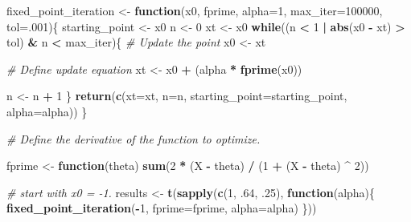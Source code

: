 \documentclass[]{article}
\newenvironment{Shaded}{\begin{snugshade}}{\end{snugshade}}
\newcommand{\KeywordTok}[1]{\textcolor[rgb]{0.13,0.29,0.53}{\textbf{#1}}}
\newcommand{\DataTypeTok}[1]{\textcolor[rgb]{0.13,0.29,0.53}{#1}}
\newcommand{\DecValTok}[1]{\textcolor[rgb]{0.00,0.00,0.81}{#1}}
\newcommand{\StringTok}[1]{\textcolor[rgb]{0.31,0.60,0.02}{#1}}
\newcommand{\CommentTok}[1]{\textcolor[rgb]{0.56,0.35,0.01}{\textit{#1}}}
\newcommand{\ControlFlowTok}[1]{\textcolor[rgb]{0.13,0.29,0.53}{\textbf{#1}}}
\newcommand{\OperatorTok}[1]{\textcolor[rgb]{0.81,0.36,0.00}{\textbf{#1}}}
\newcommand{\NormalTok}[1]{#1}
\begin{document}
\begin{Shaded}
\begin{Highlighting}[]
\NormalTok{fixed_point_iteration <-}\StringTok{ }\ControlFlowTok{function}\NormalTok{(x0, fprime, }\DataTypeTok{alpha=}\DecValTok{1}\NormalTok{, }\DataTypeTok{max_iter=}\DecValTok{100000}\NormalTok{, }\DataTypeTok{tol=}\NormalTok{.}\DecValTok{001}\NormalTok{)\{}
\NormalTok{  starting_point <-}\StringTok{ }\NormalTok{x0}
\NormalTok{  n <-}\StringTok{ }\DecValTok{0}
\NormalTok{  xt <-}\StringTok{ }\NormalTok{x0}
  \ControlFlowTok{while}\NormalTok{((n }\OperatorTok{<}\StringTok{ }\DecValTok{1} \OperatorTok{|}\StringTok{ }\KeywordTok{abs}\NormalTok{(x0 }\OperatorTok{-}\StringTok{ }\NormalTok{xt) }\OperatorTok{>}\StringTok{ }\NormalTok{tol) }\OperatorTok{&}\StringTok{ }\NormalTok{n }\OperatorTok{<}\StringTok{ }\NormalTok{max_iter)\{}
    \CommentTok{# Update the point}
\NormalTok{    x0 <-}\StringTok{ }\NormalTok{xt}
    
    \CommentTok{# Define update equation}
\NormalTok{    xt <-}\StringTok{ }\NormalTok{x0 }\OperatorTok{+}\StringTok{ }\NormalTok{(alpha }\OperatorTok{*}\StringTok{ }\KeywordTok{fprime}\NormalTok{(x0))}
    
\NormalTok{    n <-}\StringTok{ }\NormalTok{n }\OperatorTok{+}\StringTok{ }\DecValTok{1}
\NormalTok{  \}}
  \KeywordTok{return}\NormalTok{(}\KeywordTok{c}\NormalTok{(}\DataTypeTok{xt=}\NormalTok{xt,  }\DataTypeTok{n=}\NormalTok{n, }\DataTypeTok{starting_point=}\NormalTok{starting_point, }\DataTypeTok{alpha=}\NormalTok{alpha))}
\NormalTok{\}}

\CommentTok{# Define the derivative of the function to optimize. }

\NormalTok{fprime <-}\StringTok{ }\ControlFlowTok{function}\NormalTok{(theta) }\KeywordTok{sum}\NormalTok{(}\DecValTok{2} \OperatorTok{*}\StringTok{ }\NormalTok{(X }\OperatorTok{-}\StringTok{ }\NormalTok{theta) }\OperatorTok{/}\StringTok{ }\NormalTok{(}\DecValTok{1} \OperatorTok{+}\StringTok{ }\NormalTok{(X }\OperatorTok{-}\StringTok{ }\NormalTok{theta) }\OperatorTok{^}\StringTok{ }\DecValTok{2}\NormalTok{))}

\CommentTok{# start with x0 = -1.}
\NormalTok{results <-}\StringTok{ }\KeywordTok{t}\NormalTok{(}\KeywordTok{sapply}\NormalTok{(}\KeywordTok{c}\NormalTok{(}\DecValTok{1}\NormalTok{, .}\DecValTok{64}\NormalTok{, .}\DecValTok{25}\NormalTok{), }\ControlFlowTok{function}\NormalTok{(alpha)\{}
  \KeywordTok{fixed_point_iteration}\NormalTok{(}\OperatorTok{-}\DecValTok{1}\NormalTok{, }\DataTypeTok{fprime=}\NormalTok{fprime, }\DataTypeTok{alpha=}\NormalTok{alpha)  }
\NormalTok{\}))}
\end{Highlighting}
\end{Shaded}
\end{document}
